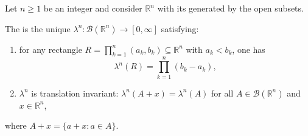 \begin{definition} \label{definition:lebesgue_measure_on_Rn}
    Let $n \ge 1$ be an integer and consider $\mathbb{R}^n$ with its  generated by the open subsets.

    The  is the unique  $\lambda^n : \mathcal{B}(\mathbb{R}^n) \to [0,\infty]$ satisfying:
    \begin{enumerate}
    \item for any rectangle $R = \prod_{k=1}^n (a_k,b_k) \subseteq \mathbb{R}^n$  with $a_k < b_k$, one has
    $$\lambda^n(R) = \prod_{k=1}^n (b_k - a_k),$$
    \item $\lambda^n$ is translation invariant: $\lambda^n(A + x) = \lambda^n(A)$ for all $A \in \mathcal{B}(\mathbb{R}^n)$ and $x \in \mathbb{R}^n$,
    \end{enumerate}
    where $A + x = \{a + x : a \in A\}$.
\end{definition}